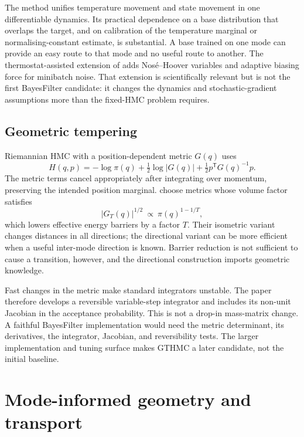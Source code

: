 \documentclass[11pt]{article}
\begin{document}
The method unifies temperature movement and state movement in one differentiable
dynamics.  Its practical dependence on a base distribution that overlaps the target,
and on calibration of the temperature marginal or normalising-constant estimate, is
substantial.  A base trained on one mode can provide an easy route to that mode and
no useful route to another.  The thermostat-assisted extension of
\citet{luo2019thermostat} adds Nos\'e--Hoover variables and adaptive biasing force for
minibatch noise.  That extension is scientifically relevant but is not the first
BayesFilter candidate: it changes the dynamics and stochastic-gradient assumptions
more than the fixed-HMC problem requires.

\subsection{Geometric tempering}

Riemannian HMC with a position-dependent metric $G(q)$ uses
\begin{equation}
  H(q,p)=-\log\pi(q)+\tfrac12\log|G(q)|
         +\tfrac12p^\mathsf{T}G(q)^{-1}p.
  \label{eq:rmhmc}
\end{equation}
The metric terms cancel appropriately after integrating over momentum, preserving
the intended position marginal.  \citet{nishimura2020geometric} choose metrics whose
volume factor satisfies
\begin{equation}
  |G_T(q)|^{1/2}\ \propto\ \pi(q)^{1-1/T},
  \label{eq:gthmc-condition}
\end{equation}
which lowers effective energy barriers by a factor $T$.  Their isometric variant
changes distances in all directions; the directional variant can be more efficient
when a useful inter-mode direction is known.  Barrier reduction is not sufficient to
cause a transition, however, and the directional construction imports geometric
knowledge.

Fast changes in the metric make standard integrators unstable.  The paper therefore
develops a reversible variable-step integrator and includes its non-unit Jacobian in
the acceptance probability.  This is not a drop-in mass-matrix change.  A faithful
BayesFilter implementation would need the metric determinant, its derivatives, the
integrator, Jacobian, and reversibility tests.  The larger implementation and tuning
surface makes GTHMC a later candidate, not the initial baseline.

\section{Mode-informed geometry and transport}
\end{document}
